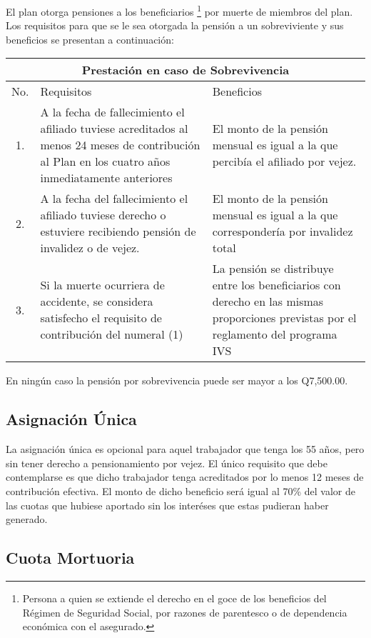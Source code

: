 \documentclass[12pt,letterpaper,titlepage]{article}
\begin{document}
{El plan otorga pensiones a los beneficiarios \footnote{Persona a quien se extiende el derecho en el goce de los beneficios del Régimen de Seguridad Social, por razones de parentesco o de dependencia económica con el asegurado.} por muerte de miembros del plan. Los requisitos para que se le sea otorgada la pensión a un sobreviviente y sus beneficios se presentan a continuación:

\begin{center}
	\begin{tabular}{|c||p{6cm}||p{6cm}|}
		\hline 
		\multicolumn{3}{|c|}{Prestación en caso de Sobrevivencia} \\ 
		\hline
		\hline 
		No. & Requisitos & Beneficios \\ 
		\hline
		1. & A la fecha de fallecimiento el afiliado tuviese acreditados al menos 24 meses de contribución al Plan en los cuatro años inmediatamente anteriores & El monto de la pensión mensual es igual a la que percibía el afiliado por vejez. \\ 
		\hline
		2. & A la fecha del fallecimiento el afiliado tuviese derecho o estuviere recibiendo pensión de invalidez o de vejez. & El monto de la pensión mensual es igual a la que correspondería por invalidez total \\ 
		\hline 
		3. & Si la muerte ocurriera de accidente, se considera satisfecho el requisito de contribución del numeral (1) & La pensión se distribuye entre los beneficiarios con derecho en las mismas proporciones previstas por el reglamento del programa IVS \\ 
		\hline
	\end{tabular} 
\end{center}

En ningún caso la pensión por sobrevivencia puede ser mayor a los Q7,500.00.

\subsection{Asignación Única}

La asignación única es opcional para aquel trabajador que tenga los 55 años, pero sin tener derecho a pensionamiento por vejez. El único requisito que debe contemplarse es que dicho trabajador tenga acreditados por lo menos 12 meses de contribución efectiva. El monto de dicho beneficio será igual al 70\% del valor de las cuotas que hubiese aportado sin los interéses que estas pudieran haber generado.

\subsection{Cuota Mortuoria}

}
\end{document}
